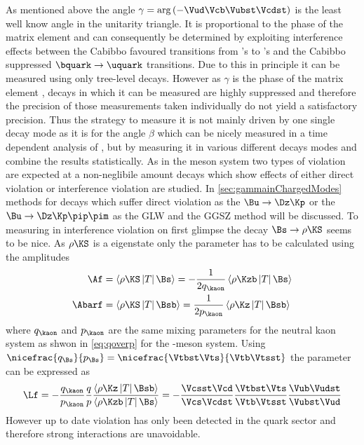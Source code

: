 As mentioned above the angle $\gamma=\arg\left(-\Vud\Vcb\Vubst\Vcdst\right)$ is the least well know angle in the unitarity triangle.
It is proportional to the phase of the matrix element \Vub and can consequently be determined by exploiting interference effects between the Cabibbo favoured transitions from \bquark's to \cquark's and the Cabibbo suppressed $\bquark\to\uquark$ transitions.
Due to this in principle it can be measured using only tree-level decays.
However as $\gamma$ is the phase of the matrix element \Vub, decays in which it can be measured are highly suppressed and therefore the precision of those measurements taken individually do not yield a satisfactory precision.
Thus the strategy to measure it is not mainly driven by one single decay mode as it is for the angle $\beta$ which can be nicely measured in a time dependent analysis of \BdToJPsiKS, but by measuring it in various different decays modes and combine the results statistically.
As in the \B meson system two types of \CP violation are expected at a non-neglibile amount decays which show effects of either direct \CP violation or interference \CP violation are studied.
In \cref{sec:gammainChargedModes} methods for decays which suffer direct \CP violation as the $\Bu\to\Dz\Kp$ or the $\Bu\to\Dz\Kp\pip\pim$ as the GLW and the GGSZ method will be discussed.
To measuring \gamma in interference \CP violation on first glimpse the decay $\Bs\to\rho\KS$ seems to be nice.
As $\rho\KS$ is a \CP eigenstate only the parameter \Lf has to be calculated using the amplitudes
\begin{equation}
\begin{aligned}
\Af&=\left<\rho\KS\left|T\right|\Bs\right>=-\frac{1}{2q_{\kaon}}\left<\rho\Kzb\left|T\right|\Bs\right>\\
\Abarf&=\left<\rho\KS\left|T\right|\Bsb\right>=\frac{1}{2p_{\kaon}}\left<\rho\Kz\left|T\right|\Bsb\right>
\end{aligned}
\end{equation}
where $q_{\kaon}$ and $p_{\kaon}$ are the same mixing parameters for the neutral kaon system as shwon in \cref{eq:qoverp} for the \B-meson system.
Using $\nicefrac{q_{\Bs}}{p_{\Bs}}=\nicefrac{\Vtbst\Vts}{\Vtb\Vtsst}$ the parameter \Lf can be expressed as
\begin{equation}
\Lf=-\frac{q_{\kaon}}{p_{\kaon}}\frac{q}{p}\frac{\left<\rho\Kz\left|T\right|\Bsb\right>}{\left<\rho\Kzb\left|T\right|\Bs\right>}
=-\frac{\Vcsst\Vcd}{\Vcs\Vcdst}\frac{\Vtbst\Vts}{\Vtb\Vtsst}\frac{\Vub\Vudst}{\Vubst\Vud}
\end{equation}
However up to date \CP violation has only been detected in the quark sector and therefore strong interactions are unavoidable.



